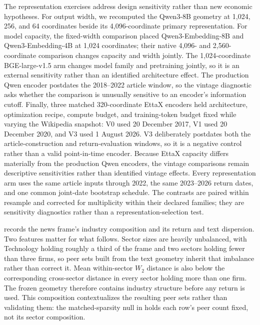 The representation exercises address design sensitivity rather than new
economic hypotheses.
For output width, we recomputed the Qwen3-8B geometry at 1,024, 256, and 64
coordinates beside its 4,096-coordinate primary representation.
For model capacity, the fixed-width comparison placed Qwen3-Embedding-8B and
Qwen3-Embedding-4B at 1,024 coordinates; their native 4,096- and
2,560-coordinate comparison changes capacity and width jointly.
The 1,024-coordinate BGE-large-v1.5 arm changes model family and pretraining
jointly, so it is an external sensitivity rather than an identified
architecture effect.
The production Qwen encoder postdates the 2018--2022 article window, so the
vintage diagnostic asks whether the comparison is unusually sensitive to an
encoder's information cutoff.
Finally, three matched 320-coordinate EttaX encoders held architecture,
optimization recipe, compute budget, and training-token budget fixed while
varying the Wikipedia snapshot: V0 used 20 December 2017, V1 used 20 December
2020, and V3 used 1 August 2026.
V3 deliberately postdates both the article-construction and return-evaluation
windows, so it is a negative control rather than a valid point-in-time encoder.
Because EttaX capacity differs materially from the production Qwen encoders,
the vintage comparisons remain descriptive sensitivities rather than identified
vintage effects.
Every representation arm uses the same article inputs through 2022, the same
2023--2026 return dates, and one common joint-date bootstrap schedule.
The contrasts are paired within resample and corrected for multiplicity within
their declared families; they are sensitivity diagnostics rather than a
representation-selection test.



 records the news frame's industry composition
and its return and text dispersion.
Two features matter for what follows.
Sector sizes are heavily unbalanced, with Technology holding roughly a third of
the frame and two sectors holding fewer than three firms, so peer sets built
from the text geometry inherit that imbalance rather than correct it.
Mean within-sector $W_2$ distance is also below the corresponding cross-sector
distance in every sector holding more than one firm.
The frozen geometry therefore contains industry structure before any return is
used.
This composition contextualizes the resulting peer sets rather than validating
them: the matched-sparsity null in  holds each
row's peer count
fixed, not its sector composition.

